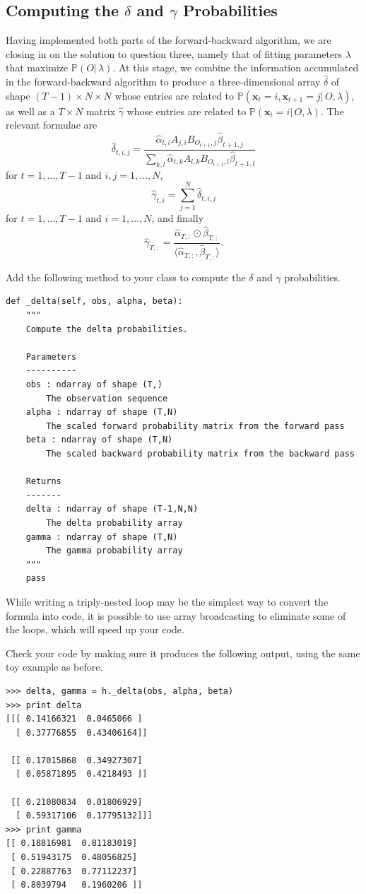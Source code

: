 \subsection*{Computing the $\delta$ and $\gamma$ Probabilities}
Having implemented both parts of the forward-backward algorithm, we are closing in on the solution to question three, namely that of fitting parameters $\lambda$ that maximize $\mathbb{P}(O | \, \lambda)$.
At this stage, we combine the information accumulated in the forward-backward algorithm to produce a three-dimensional array $\widehat{\delta}$
of shape $(T-1)\times N \times N$ whose entries are related to $\mathbb{P}(\mathbf{x}_t = i, \mathbf{x}_{t+1} = j|\, O, \lambda)$, as well as
a $T \times N$ matrix $\widehat{\gamma}$ whose entries are related to $\mathbb{P}(\mathbf{x}_t=i | \, O, \lambda)$.
The relevant formulae are
\[
\widehat{\delta}_{t,i,j} = \frac{\widehat{\alpha}_{t,i}A_{j,i}B_{O_{t+1},j}\widehat{\beta}_{t+1,j}}{\sum_{k,l}\widehat{\alpha}_{t,k}A_{l,k}B_{O_{t+1},l}\widehat{\beta}_{t+1,l}}
\]
for $t = 1, \ldots, T-1$ and $i,j = 1, \ldots, N$,
\[
\widehat{\gamma}_{t,i} = \sum_{j=1}^N \widehat{\delta}_{t,i,j}
\]
for $t = 1,\ldots,T-1$ and $i=1,\ldots,N$, and finally
\[
\widehat{\gamma}_{T,:} = \frac{\widehat{\alpha}_{T,:}\odot \widehat{\beta}_{T,:}}{\langle\widehat{\alpha}_{T,:}, \widehat{\beta}_{T,:}\rangle}.
\]

\begin{problem}
Add the following method to your class to compute the $\delta$ and $\gamma$ probabilities.
\begin{lstlisting}
def _delta(self, obs, alpha, beta):
    """
    Compute the delta probabilities.

    Parameters
    ----------
    obs : ndarray of shape (T,)
        The observation sequence
    alpha : ndarray of shape (T,N)
        The scaled forward probability matrix from the forward pass
    beta : ndarray of shape (T,N)
        The scaled backward probability matrix from the backward pass

    Returns
    -------
    delta : ndarray of shape (T-1,N,N)
        The delta probability array
    gamma : ndarray of shape (T,N)
        The gamma probability array
    """
    pass
\end{lstlisting}
While writing a triply-nested loop may be the simplest way to convert the formula into code,
it is possible to use array broadcasting to eliminate some of the loops, which will speed up your code.

Check your code by making sure it produces the following output, using the same toy example as before.
\begin{lstlisting}
>>> delta, gamma = h._delta(obs, alpha, beta)
>>> print delta
[[[ 0.14166321  0.0465066 ]
  [ 0.37776855  0.43406164]]

 [[ 0.17015868  0.34927307]
  [ 0.05871895  0.4218493 ]]

 [[ 0.21080834  0.01806929]
  [ 0.59317106  0.17795132]]]
>>> print gamma
[[ 0.18816981  0.81183019]
 [ 0.51943175  0.48056825]
 [ 0.22887763  0.77112237]
 [ 0.8039794   0.1960206 ]]
\end{lstlisting}
\end{problem}

